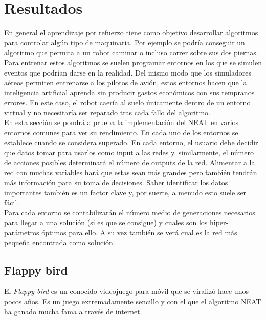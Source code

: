 \documentclass{article}
\begin{document}



\section{Resultados}
En general el aprendizaje por refuerzo tiene como objetivo desarrollar algoritmos para controlar algún tipo de maquinaria. Por ejemplo se podría conseguir un algoritmo que permita a un robot caminar o incluso correr sobre sus dos piernas. Para entrenar estos algoritmos se suelen programar entornos en los que se simulen eventos que podrían darse en la realidad. Del mismo modo que los simuladores aéreos permiten entrenarse a los pilotos de avión, estos entornos hacen que la inteligencia artificial aprenda sin producir gastos económicos con sus tempranos errores. En este caso, el robot caería al suelo únicamente dentro de un entorno virtual y no necesitaría ser reparado tras cada fallo del algoritmo.\\

En esta sección se pondrá a prueba la implementación del NEAT en varios entornos comunes para ver su rendimiento. En cada uno de los entornos se establece cuando se considera superado. En cada entorno, el usuario debe decidir que datos tomar para usarlos como input a las redes y, similarmente, el número de acciones posibles determinará el número de outputs de la red. Alimentar a la red con muchas variables hará que estas sean más grandes pero también tendrán más información para su toma de decisiones. Saber identificar los datos importantes también es un factor clave y, por suerte, a menudo esto suele ser fácil.\\

Para cada entorno se contabilizarán el número medio de generaciones necesarios para llegar a una solución (si es que se consigue) y cuales son los hiper-parámetros óptimos para ello. A su vez también se verá cual es la red más pequeña encontrada como solución.
\subsection{Flappy bird}
El \textit{Flappy bird} es un conocido videojuego para móvil que se viralizó hace unos pocos años. Es un juego extremadamente sencillo y con el que el algoritmo NEAT ha ganado mucha fama a través de internet.\\
\end{document}
